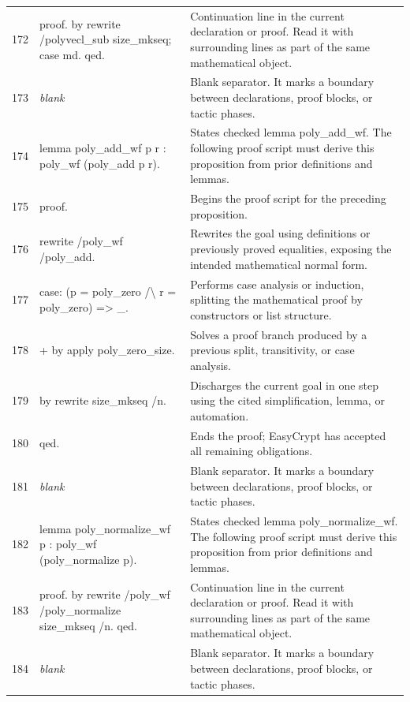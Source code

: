 \documentclass[10pt]{article}
\begin{document}
\begin{longtable}{r L{0.53\textwidth} L{0.37\textwidth}}
172 & {\ttfamily\scriptsize proof. by rewrite /polyvecl\_sub size\_mkseq; case md. qed.} & Continuation line in the current declaration or proof.  Read it with surrounding lines as part of the same mathematical object. \\
173 & {\ttfamily\scriptsize \emph{blank}} & Blank separator.  It marks a boundary between declarations, proof blocks, or tactic phases. \\
174 & {\ttfamily\scriptsize lemma poly\_add\_wf p r : poly\_wf (poly\_add p r).} & States checked lemma poly\_add\_wf.  The following proof script must derive this proposition from prior definitions and lemmas. \\
175 & {\ttfamily\scriptsize proof.} & Begins the proof script for the preceding proposition. \\
176 & {\ttfamily\scriptsize rewrite /poly\_wf /poly\_add.} & Rewrites the goal using definitions or previously proved equalities, exposing the intended mathematical normal form. \\
177 & {\ttfamily\scriptsize case: (p = poly\_zero /\textbackslash{} r = poly\_zero) => \_.} & Performs case analysis or induction, splitting the mathematical proof by constructors or list structure. \\
178 & {\ttfamily\scriptsize + by apply poly\_zero\_size.} & Solves a proof branch produced by a previous split, transitivity, or case analysis. \\
179 & {\ttfamily\scriptsize by rewrite size\_mkseq /n.} & Discharges the current goal in one step using the cited simplification, lemma, or automation. \\
180 & {\ttfamily\scriptsize qed.} & Ends the proof; EasyCrypt has accepted all remaining obligations. \\
181 & {\ttfamily\scriptsize \emph{blank}} & Blank separator.  It marks a boundary between declarations, proof blocks, or tactic phases. \\
182 & {\ttfamily\scriptsize lemma poly\_normalize\_wf p : poly\_wf (poly\_normalize p).} & States checked lemma poly\_normalize\_wf.  The following proof script must derive this proposition from prior definitions and lemmas. \\
183 & {\ttfamily\scriptsize proof. by rewrite /poly\_wf /poly\_normalize size\_mkseq /n. qed.} & Continuation line in the current declaration or proof.  Read it with surrounding lines as part of the same mathematical object. \\
184 & {\ttfamily\scriptsize \emph{blank}} & Blank separator.  It marks a boundary between declarations, proof blocks, or tactic phases. \\

\end{longtable}
\end{document}
